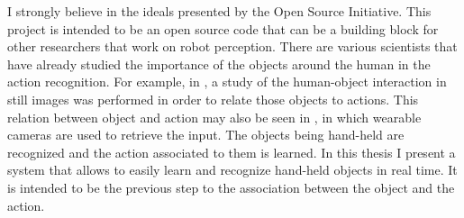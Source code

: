 I strongly believe in the ideals presented by the Open Source Initiative. 
This project is intended to be an open source code that can be a building block for other researchers that work on robot perception.
There are various scientists that have already studied the importance of the objects around the human in the action recognition. 
For example, in \cite{Delaitre}, a study of the human-object interaction in still images was performed in order to relate those objects to actions. 
	This relation between object and action may also be seen in \cite{Fathi}, in which wearable cameras are used to retrieve the input. 
	The objects being hand-held are recognized and the action associated to them is learned. 
	In this thesis I present a system that allows to easily learn and recognize hand-held objects in real time. 
	It is intended to be the previous step to the association between the object and the action. 







